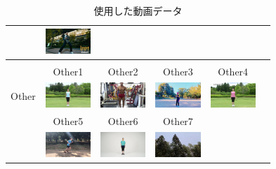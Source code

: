 \begin{table}[t]
\begin{center}
\begin{tabular}{|c|ccc|cc|}
        & \includegraphics[width=17mm]{images/snaps/legit_dance.png}
      \\ \hline
        &&&&& \\
        & Other1\cite{radio} & Other2\cite{posing} & Other3\cite{boxing} & Other4\cite{radio2} &
      \\
      Other
        & \includegraphics[width=17mm]{images/snaps/radio_exer.png}
        & \includegraphics[width=17mm]{images/snaps/posing.png}
        & \includegraphics[width=17mm]{images/snaps/shadowboxing.png}
        & \includegraphics[width=17mm]{images/snaps/radio_exer_2.png}
        &
      \\
        & Other5\cite{running} & Other6\cite{shinkokyu} & Other7\cite{leaves} & &
      \\
        & \includegraphics[width=17mm]{images/snaps/running.png}
        & \includegraphics[width=17mm]{images/snaps/shinkokyu.png}
        & \includegraphics[width=17mm]{images/snaps/leaves.png}
        &
        &
      \\ \hline
    \end{tabular}
  \end{center}
  \caption{使用した動画データ}
  \label{video_data}
\end{table}
\clearpage

